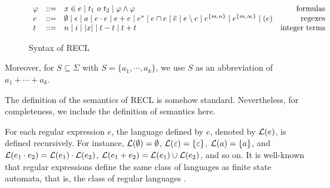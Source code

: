 \begin{figure}[h]
  \centering
$ \begin{array}{l l l r}
    \varphi & ::= & x\in e \mid t_1\  o\ t_2 \mid  \varphi \wedge \varphi                                              & \mbox{formulas}            \\
    e &::= & \emptyset \mid \epsilon \mid a \mid e\cdot e \mid e+e \mid e^* \mid e \cap e \mid \overline{e} \mid e \setminus e \mid e^{\{m,n\}} \mid e^{\{m,\infty\}} \mid (e) & \mbox{regexes} \\
    t &::= & n \mid i \mid  |x| \mid t - t \mid t + t                                                                    & \mbox{integer terms}
    \end{array}
  $
  \caption{Syntax of RECL }\label{fig:syntax}
\end{figure}
Moreover, for $S \subseteq \Sigma$ with $S = \{a_1, \cdots, a_k\}$, we use $S$ as an abbreviation of $a_1 + \cdots + a_k$.

The definition of the semantics of RECL is somehow standard. Nevertheless, for completeness, we include the definition of semantics here. 

For each regular expression $e$, the language defined by $e$, denoted by $\mathcal{L}(e)$, is defined recursively. For instance, $\mathcal{L}(\emptyset) = \emptyset$, $\mathcal{L}(\varepsilon) = \{\varepsilon\}$, $\mathcal{L}(a) = \{a\}$, and $\mathcal{L}(e_1 \cdot e_2) = \mathcal{L}(e_1) \cdot \mathcal{L}(e_2)$, $\mathcal{L}(e_1 + e_2) = \mathcal{L}(e_1) \cup \mathcal{L}(e_2)$, and so on. 
It is well-known that regular expressions define the same class of languages as finite state automata, that is, the class of regular languages \cite{HU79}. 

